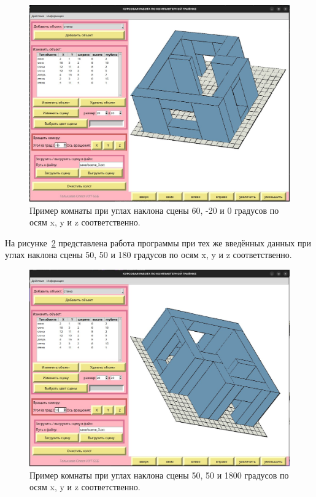 \begin{figure}[H]
    \centering
    \includegraphics[width=1\textwidth]{img/example_flat_60_-20_0.png}
    \caption{Пример комнаты при углах наклона сцены 60, -20 и 0 градусов по осям x, y и z соответственно.}
    \label{fig:example_flat_60_-20_0}
\end{figure}

На рисунке~\ref{fig:example_flat_50_50_180} представлена работа программы при тех же введённых данных при углах наклона сцены 50, 50 и 180 градусов по осям x, y и z соответственно.

\begin{figure}[H]
    \centering
    \includegraphics[width=1\textwidth]{img/example_flat_50_50_180.png}
    \caption{Пример комнаты при углах наклона сцены 50, 50 и 1800 градусов по осям x, y и z соответственно.}
    \label{fig:example_flat_50_50_180}
\end{figure}


